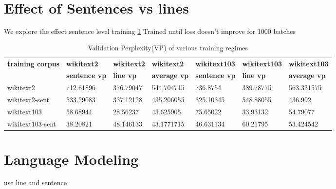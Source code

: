\section{Effect of Sentences vs lines}
We explore the effect sentence level training \ref{table:effectofsentvsline}
Trained until loss doesn't improve for 1000 batches
\begin{table}[h!]
\tiny
\begin{tabular}{|l|l|l|l|l|l|l|} \hline
\textbf{training corpus} & \textbf{wikitext2} & \textbf{wikitext2} & \textbf{wikitext2}  & \textbf{wikitext103} & \textbf{wikitext103} & \textbf{wikitext103} \\ 
& \textbf{sentence vp} & \textbf{line vp} & \textbf{average vp}  & \textbf{sentence vp} & \textbf{line vp} & \textbf{average vp} \\ \hline
wikitext2 & 712.61896 & 376.79047 &544.704715 &  736.8754 & 389.78775 & 563.331575\\ \hline
wikitext2-sent & 533.29083 & 337.12128 & 435.206055&  325.10345 & 548.88055 & 436.992 \\ \hline
wikitext103 & 58.68944 & 28.56237 & 43.625905 & 75.65022 & 33.93132 & 54.79077\\ \hline
wikitext103-sent & 38.20821 & 48.146133& 43.1771715& 46.631134 & 60.21795 & 53.424542 \\ \hline
\end{tabular}
\caption{Validation Perplexity(VP) of various training regimes}
\label{table:effectofsentvsline}
\end{table}
\section{Language Modeling}
use line and sentence
